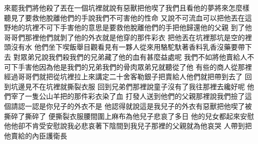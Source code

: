 來罷\chientien 我們將他殺了\chientien 丟在一個坑裡\chientien 就說有惡獸把他喫了\chientien 我們且看他的夢將來怎麼樣\chuan 
{}聽見了要救他脫離他們的手\chientien 說\chientien 我們不可害他的性命\chuan 
{}又說\chientien 不可流血\chientien 可以把他丟在這野地的坑裡\chientien 不可下手害他\yuentien{}的意思是要救他脫離他們的手\chientien 把他歸還他的父親\chuan 
{}到了他哥哥們那裡\chientien 他們就剝了他的外衣\chientien 就是他穿的那件彩衣\yuentien 
{}把他丟在坑裡\yuentien 那坑是空的\chientien 裡頭沒有水\chuan\Chuan
{}他們坐下喫飯\chientien 舉目觀看\chientien 見有一夥人\chientien 從來\chientien 用駱駝馱著香料\chientien 乳香\chientien 沒藥\chientien 要帶下去\chuan 
{}對眾弟兄說\chientien 我們殺我們的兄弟\chientien 藏了他的血\chientien 有甚麼益處呢\chuan 
{}我們不如將他賣給人\chientien 不可下手害他\chientien 因為他是我們的兄弟\chientien 我們的骨肉\yuentien 眾弟兄就聽從了他\chuan 
{}有些的商人\chientien 從那裡經過\chientien 哥哥們就把從坑裡拉上來\chientien 講定二十舍客勒銀子\chientien 把賣給人\yuentien 他們就把帶到去了\chuan\Chuan
{}回到坑邊\chientien 見不在坑裡\chientien 就撕裂衣服\chuan 
{}回到兄弟們那裡\chientien 說\chientien 童子沒有了\chientien 我往那裡去纔好呢\chuan 
{}他們宰了一隻公山羊\chientien 把的那件彩衣染了血\yuentien 
{}打發人送到他們的父親那裡說\chientien 我們撿了這個\chientien 請認一認\chientien 是你兒子的外衣不是\chuan 
{}他認得\chientien 就說\chientien 這是我兒子的外衣\chientien 有惡獸把他喫了\chientien{}被撕碎了\chientien 撕碎了\chuan 
{}便撕裂衣服\chientien 腰間圍上麻布\chientien 為他兒子悲哀了多日\chuan 
{}他的兒女都起來安慰他\yuentien 他卻不肯受安慰\chientien 說\chientien 我必悲哀著下陰間到我兒子那裡\yuentien{}的父親就為他哀哭\chuan 
{}人帶到\chientien 把他賣給的內臣\chientien 護衛長\chuan 
